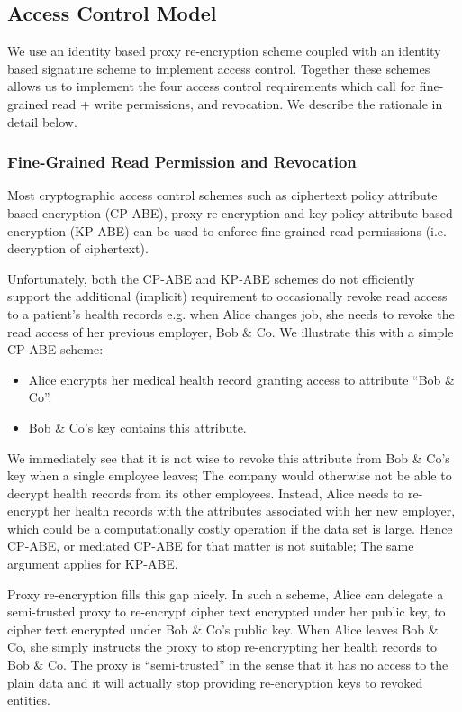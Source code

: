 \documentclass[]{article}
\begin{document}
\subsection{Access Control Model}
We use an identity based proxy re-encryption scheme coupled with an identity based signature scheme to implement access control. Together these schemes allows us to implement the four access control requirements which call for fine-grained read + write permissions, and revocation. We describe the rationale in detail below.
\subsubsection{Fine-Grained Read Permission and Revocation}

Most cryptographic access control schemes such as ciphertext policy attribute based encryption (CP-ABE), proxy re-encryption and key policy attribute based encryption (KP-ABE) can be used to enforce fine-grained read permissions (i.e. decryption of ciphertext).

Unfortunately, both the CP-ABE and KP-ABE schemes do not efficiently support the additional (implicit) requirement to occasionally revoke read access to a patient's health records e.g. when Alice changes job, she needs to revoke the read access of her previous employer, Bob \& Co. We illustrate this with a simple CP-ABE scheme:
\begin{itemize}
\item Alice encrypts her medical health record granting access to attribute “Bob \& Co”. 
\item Bob \& Co's key contains this attribute.
\end{itemize}

We immediately see that it is not wise to revoke this attribute from Bob \& Co's key when a single employee leaves; The company would otherwise not be able to decrypt health records from its other employees. Instead, Alice needs to re-encrypt her health records with the attributes associated with her new employer, which could be a computationally costly operation if the data set is large. Hence CP-ABE, or mediated CP-ABE for that matter is not suitable; The same argument applies for KP-ABE.

Proxy re-encryption fills this gap nicely. In such a scheme, Alice can delegate a semi-trusted proxy to re-encrypt cipher text encrypted under her public key, to cipher text encrypted under Bob \& Co's public key. When Alice leaves Bob \& Co, she simply instructs the proxy to stop re-encrypting her health records to Bob \& Co. The proxy is ``semi-trusted'' in the sense that it has no access to the plain data and it will actually stop providing re-encryption keys to revoked entities.
\end{document}
